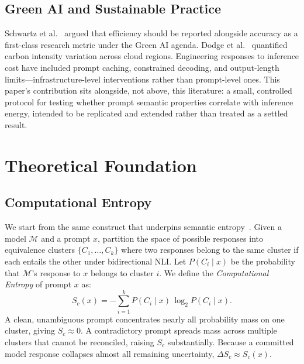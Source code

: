 \documentclass[conference]{IEEEtran}
\begin{document}
\subsection{Green AI and Sustainable Practice}
Schwartz et al.~\cite{schwartz2020green} argued that efficiency should
be reported alongside accuracy as a first-class research metric under
the Green AI agenda. Dodge et al.~\cite{dodge2022measuring} quantified
carbon intensity variation across cloud regions. Engineering responses
to inference cost have included prompt caching, constrained decoding,
and output-length limits---infrastructure-level interventions rather
than prompt-level ones. This paper's contribution sits alongside, not
above, this literature: a small, controlled protocol for testing
whether prompt semantic properties correlate with inference energy,
intended to be replicated and extended rather than treated as a
settled result.
\section{Theoretical Foundation}
\label{sec:theory}
\subsection{Computational Entropy}
We start from the same construct that underpins semantic
entropy~\cite{kuhn2023semantic}. Given a model $\mathcal{M}$ and a
prompt $x$, partition the space of possible responses into equivalence
clusters $\{C_1, \ldots, C_k\}$ where two responses belong to the same
cluster if each entails the other under bidirectional NLI. Let
$P(C_i \mid x)$ be the probability that $\mathcal{M}$'s response to
$x$ belongs to cluster $i$. We define the \emph{Computational Entropy}
of prompt $x$ as:
\begin{equation}
  S_c(x) = -\sum_{i=1}^{k} P(C_i \mid x)\,\log_2 P(C_i \mid x).
  \label{eq:sc}
\end{equation}
A clean, unambiguous prompt concentrates nearly all probability mass
on one cluster, giving $S_c \approx 0$. A contradictory prompt spreads
mass across multiple clusters that cannot be reconciled, raising
$S_c$ substantially. Because a committed model response collapses
almost all remaining uncertainty, $\Delta S_c \approx S_c(x)$.
\end{document}
